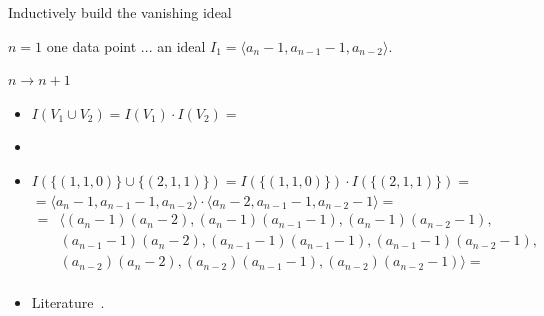 \documentclass[t,usenames,dvipsnames]{beamer} %
\newcommand{\1}{\boldsymbol{1}}
\newcommand{\0}{\boldsymbol{0}}
\begin{document}
\begin{frame}{Inductively build the vanishing ideal}

    \begin{block}{$n=1$}
        one data point ... an ideal $I_1 = \langle a_n - 1, a_{n-1} - 1, a_{n-2} \rangle$.
    \end{block}

    \begin{block}{$n \to n+1$}

        \begin{itemize}
        \item
                $ I( V_1 \cup V_2 ) = I(V_1) \cdot I(V_2) = $ \\ 
        
        \item
        \item
                $I(\{(1,1,0)\} \cup \{(2,1,1)\}) = I(\{(1,1,0)\}) \cdot I(\{(2,1,1)\}) = $ \\  
               $ = \langle a_n - 1, a_{n-1} - 1, a_{n-2} \rangle \cdot \langle a_n - 2, a_{n-1} - 1, a_{n-2}-1 \rangle = $   \pause
    \begin{align*}
     = & \langle (a_n -1)(a_n -2), (a_n -1)(a_{n-1} -1), (a_n -1)(a_{n -2}-1), \\ 
    & (a_{n-1} -1)(a_n -2),  (a_{n-1} -1)(a_{n-1} -1), (a_{n-1} -1)(a_{n -2}-1), \\
    & (a_{n -2})(a_n -2), (a_{n -2})(a_{n-1} -1), (a_{n -2})(a_{n -2}-1) \rangle = \\
    \end{align*}

        \item Literature~\cite[p.~24, Section~2.1, Chapter~1]{Shafarevich}.

        \end{itemize}

    \end{block}
\end{frame}
\end{document}
